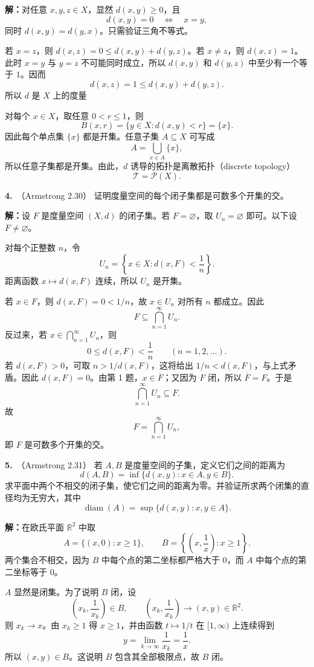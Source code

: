 \documentclass{article}
\newcommand{\R}{\mathbb R}
\newcommand{\problem}[2]{\par\medskip\noindent\textbf{#1.}\ （#2）\quad}
\newcommand{\solution}{\par\noindent\textbf{解：}}
\begin{document}
\solution 对任意 $x,y,z\in X$，显然 $d(x,y)\ge0$，且
\[
  d(x,y)=0\quad\Longleftrightarrow\quad x=y,
\]
同时 $d(x,y)=d(y,x)$。只需验证三角不等式。

若 $x=z$，则 $d(x,z)=0\le d(x,y)+d(y,z)$。若 $x\ne z$，则 $d(x,z)=1$。此时 $x=y$ 与 $y=z$ 不可能同时成立，所以 $d(x,y)$ 和 $d(y,z)$ 中至少有一个等于 $1$。因而
\[
  d(x,z)=1\le d(x,y)+d(y,z).
\]
所以 $d$ 是 $X$ 上的度量

对每个 $x\in X$，取任意 $0<r\le1$，则
\[
  B(x,r)=\{y\in X:d(x,y)<r\}=\{x\}.
\]
因此每个单点集 $\{x\}$ 都是开集。任意子集 $A\subseteq X$ 可写成
\[
  A=\bigcup_{x\in A}\{x\},
\]
所以任意子集都是开集。由此，$d$ 诱导的拓扑是离散拓扑（discrete topology）
\[
  \mathcal T=\mathcal P(X).
\]

\problem{4}{Armstrong 2.30}
证明度量空间的每个闭子集都是可数多个开集的交。



\solution 设 $F$ 是度量空间 $(X,d)$ 的闭子集。若 $F=\varnothing$，取 $U_n=\varnothing$ 即可。以下设 $F\ne\varnothing$。

对每个正整数 $n$，令
\[
  U_n=\left\{x\in X:d(x,F)<\frac1n\right\}.
\]
距离函数 $x\mapsto d(x,F)$ 连续，所以 $U_n$ 是开集。

若 $x\in F$，则 $d(x,F)=0<1/n$，故 $x\in U_n$ 对所有 $n$ 都成立。因此
\[
  F\subseteq\bigcap_{n=1}^{\infty}U_n.
\]
反过来，若 $x\in\bigcap_{n=1}^{\infty}U_n$，则
\[
  0\le d(x,F)<\frac1n\qquad(n=1,2,\ldots).
\]
若 $d(x,F)>0$，可取 $n>1/d(x,F)$，这将给出 $1/n<d(x,F)$，与上式矛盾。因此 $d(x,F)=0$。由第 1 题，$x\in\overline F$；又因为 $F$ 闭，所以 $\overline F=F$。于是
\[
  \bigcap_{n=1}^{\infty}U_n\subseteq F.
\]
故
\[
  F=\bigcap_{n=1}^{\infty}U_n,
\]
即 $F$ 是可数多个开集的交。

\problem{5}{Armstrong 2.31}
若 $A,B$ 是度量空间的子集，定义它们之间的距离为
\[
  d(A,B)=\inf\{d(x,y):x\in A, y\in B\}.
\]
求平面中两个不相交的闭子集，使它们之间的距离为零。并验证所求两个闭集的直径均为无穷大，其中
\[
  \operatorname{diam}(A)=\sup\{d(x,y):x,y\in A\}.
\]


\solution 在欧氏平面 $\R^2$ 中取
\[
  A=\{(x,0):x\ge1\},
  \qquad
  B=\left\{\left(x,\frac1x\right):x\ge1\right\}.
\]
两个集合不相交，因为 $B$ 中每个点的第二坐标都严格大于 $0$，而 $A$ 中每个点的第二坐标等于 $0$。

$A$ 显然是闭集。为了说明 $B$ 闭，设
\[
  \left(x_k,\frac1{x_k}\right)\in B,
  \qquad
  \left(x_k,\frac1{x_k}\right)\longrightarrow (x,y)\in\R^2.
\]
则 $x_k\to x$。由 $x_k\ge1$ 得 $x\ge1$，并由函数 $t\mapsto1/t$ 在 $[1,\infty)$ 上连续得到
\[
  y=\lim_{k\to\infty}\frac1{x_k}=\frac1x.
\]
所以 $(x,y)\in B$。这说明 $B$ 包含其全部极限点，故 $B$ 闭。
\end{document}
